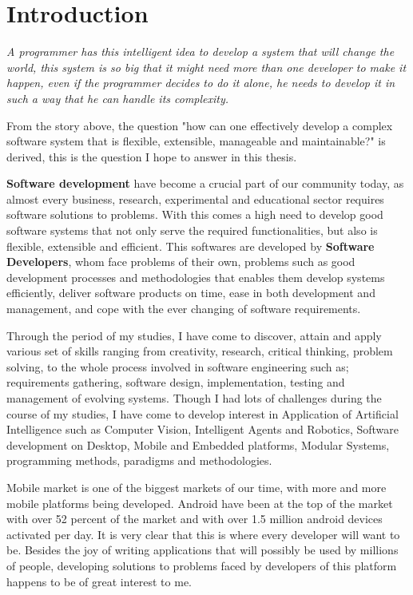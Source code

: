 \chapter{Introduction}
{\it A programmer has this intelligent idea to develop a system that will change the world, this system is so big that it might need more than one developer to make it happen, even if the programmer decides to do it alone, he needs to develop it in such a way that he can handle its complexity.}

From the story above, the question "how can one effectively develop a complex software system that is flexible, extensible, manageable and maintainable?" is derived, this is the question I hope to answer in this thesis. 

{\bf Software development} have become a crucial part of our community today, as almost every business, research, 
experimental and educational sector requires software solutions to problems. With this comes a high need to develop
good software systems that not only serve the required functionalities, but also is flexible, extensible and efficient. This 
softwares are developed by {\bf Software Developers}, whom face problems of their own, problems such as good development
processes and methodologies that enables them develop systems efficiently, deliver software products on time, ease in
both development and management, and cope with the ever changing of software requirements.


Through the period of my studies, I have come to discover, attain and apply various set of skills ranging from creativity, research, critical thinking, problem solving, to the whole process involved in software engineering such as; requirements gathering, software design, implementation, testing and management of evolving systems. Though I had lots of challenges during the course of my studies, I have come to develop interest in Application of Artificial Intelligence such as Computer Vision, Intelligent Agents and Robotics, Software development on Desktop, Mobile and Embedded platforms, Modular Systems, programming methods, paradigms and methodologies. 


Mobile market is one of the biggest markets of our time, with more and more mobile platforms being developed. Android have been at the top of the market with over 52 percent of the market and with over 1.5 million android devices activated per day. It is very clear that this is where every developer will want to be. Besides the joy of writing applications that will possibly be used by millions of people, developing solutions to problems faced by developers of this platform happens to be of great interest to me.



